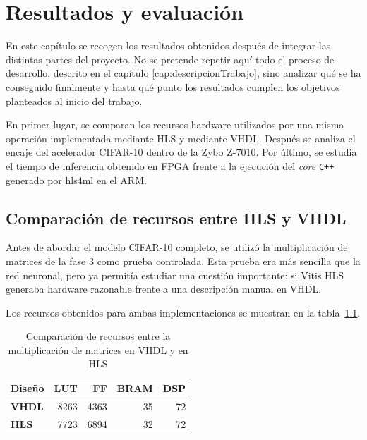\chapter{Resultados y evaluación}
\label{cap:resultadosEvaluacion}

En este capítulo se recogen los resultados obtenidos después de integrar las distintas partes del
proyecto. No se pretende repetir aquí todo el proceso de desarrollo, descrito en el capítulo
\ref{cap:descripcionTrabajo}, sino analizar qué se ha conseguido finalmente y hasta qué punto los
resultados cumplen los objetivos planteados al inicio del trabajo.

En primer lugar, se comparan los recursos hardware
utilizados por una misma operación implementada mediante \ac{HLS} y mediante \ac{VHDL}.
Después se analiza el
encaje del acelerador \ac{CIFAR}-10 dentro de la Zybo Z-7010. Por último, se estudia el tiempo de
inferencia obtenido en \ac{FPGA} frente a la ejecución del \textit{core} \texttt{C++}
generado por hls4ml en el \ac{ARM}.

\section{Comparación de recursos entre HLS y VHDL}

Antes de abordar el modelo \ac{CIFAR}-10 completo, se utilizó la multiplicación de
matrices de la fase 3
como prueba controlada. Esta prueba era más sencilla que la red neuronal, pero ya permitía estudiar
una cuestión importante: si Vitis \ac{HLS} generaba hardware razonable frente a una
descripción manual
en \ac{VHDL}.

Los recursos obtenidos para ambas implementaciones se muestran en la
tabla~\ref{tab:recursosMatricesHlsVhdl}.

\begin{table}[h!]
  \centering
  \begin{tabular}{|l|r|r|r|r|}
    \hline
    \textbf{Diseño} & \textbf{\ac{LUT}} & \textbf{FF} & \textbf{\ac{BRAM}} &
    \textbf{\ac{DSP}} \\ \hline
    \textbf{\ac{VHDL}} & 8263 & 4363 & 35 & 72 \\ \hline
    \textbf{\ac{HLS}}  & 7723 & 6894 & 32 & 72 \\ \hline
  \end{tabular}
  \caption{Comparación de recursos entre la multiplicación de matrices en VHDL y en HLS}
  \label{tab:recursosMatricesHlsVhdl}
\end{table}

